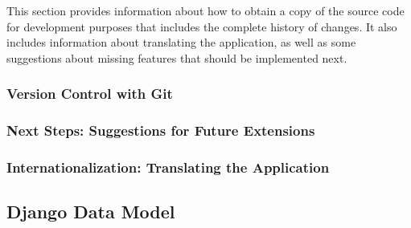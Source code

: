 This section provides information about how to obtain a copy of the
source code for development purposes that includes the complete
history of changes. It also includes information about translating the
application, as well as some suggestions about missing features that
should be implemented next.

\subsubsection{Version Control with Git}
\label{sec:git}

\subsubsection{Next Steps: Suggestions for Future Extensions}
\label{sec:next}

\subsubsection{Internationalization: Translating the Application}
\label{sec:translate}

\subsection{Django Data Model}
\label{sec:data-model}
